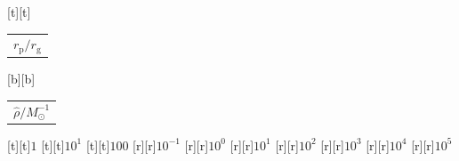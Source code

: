 %    
%
%
\begin{psfrags}%
\psfragscanon%
%
[t][t]{\color[rgb]{0,0,0}\setlength{\tabcolsep}{0pt}\begin{tabular}{c}{\Large$r_\mathrm{p}/r_\mathrm{g}$}\end{tabular}}%
[b][b]{\color[rgb]{0,0,0}\setlength{\tabcolsep}{0pt}\begin{tabular}{c}{\Large$\hat{\rho}/M_\odot^{-1}$}\end{tabular}}%
%
[t][t]{$1$}%
[t][t]{$10^{1}$}%
[t][t]{$100$}%
%
[r][r]{$10^{-1}$}%
[r][r]{$10^{0}$}%
[r][r]{$10^{1}$}%
[r][r]{$10^{2}$}%
[r][r]{$10^{3}$}%
[r][r]{$10^{4}$}%
[r][r]{$10^{5}$}%
%
%
\end{psfrags}%
%
